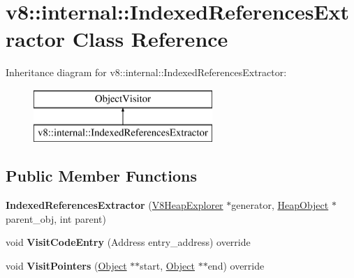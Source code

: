 \hypertarget{classv8_1_1internal_1_1_indexed_references_extractor}{}\section{v8\+:\+:internal\+:\+:Indexed\+References\+Extractor Class Reference}
\label{classv8_1_1internal_1_1_indexed_references_extractor}
Inheritance diagram for v8\+:\+:internal\+:\+:Indexed\+References\+Extractor\+:\begin{figure}[H]
\begin{center}
\leavevmode
\includegraphics[height=2.000000cm]{classv8_1_1internal_1_1_indexed_references_extractor}
\end{center}
\end{figure}
\subsection*{Public Member Functions}
\begin{DoxyCompactItemize}
\item 
{\bfseries Indexed\+References\+Extractor} (\hyperlink{classv8_1_1internal_1_1_v8_heap_explorer}{V8\+Heap\+Explorer} $\ast$generator, \hyperlink{classv8_1_1internal_1_1_heap_object}{Heap\+Object} $\ast$parent\+\_\+obj, int parent)\hypertarget{classv8_1_1internal_1_1_indexed_references_extractor_a97df6ae1d3126d4bb70ce2de2a3f295e}{}\label{classv8_1_1internal_1_1_indexed_references_extractor_a97df6ae1d3126d4bb70ce2de2a3f295e}

\item 
void {\bfseries Visit\+Code\+Entry} (Address entry\+\_\+address) override\hypertarget{classv8_1_1internal_1_1_indexed_references_extractor_a40129894e4ca3a7088fb54a9339131e7}{}\label{classv8_1_1internal_1_1_indexed_references_extractor_a40129894e4ca3a7088fb54a9339131e7}

\item 
void {\bfseries Visit\+Pointers} (\hyperlink{classv8_1_1internal_1_1_object}{Object} $\ast$$\ast$start, \hyperlink{classv8_1_1internal_1_1_object}{Object} $\ast$$\ast$end) override\hypertarget{classv8_1_1internal_1_1_indexed_references_extractor_aafec08183d4e5ae62513af3130a470dc}{}\label{classv8_1_1internal_1_1_indexed_references_extractor_aafec08183d4e5ae62513af3130a470dc}

\end{DoxyCompactItemize}
